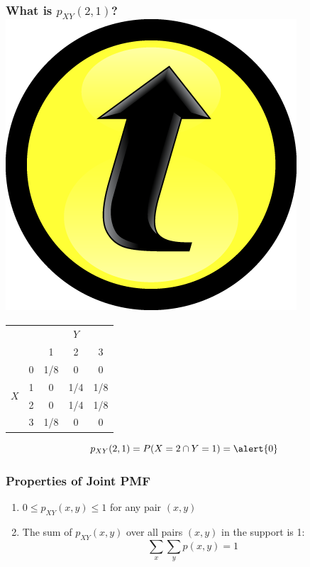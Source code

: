 \documentclass[handout]{beamer}
\begin{document}
\begin{frame}
\frametitle{What is $p_{XY}(2,1)$? \hfill \includegraphics[scale = 0.05]{./images/clicker}}

\begin{table}
\begin{tabular}{|cc|ccc|}
\hline
&&\multicolumn{3}{c|}{$Y$}\\
&&1 & 2&3\\
\hline
\multirow{4}{*}{$X$}
&0& \multicolumn{1}{|c}{\alert{1/8}} & \alert{0}& \alert{0}\\
&1& \multicolumn{1}{|c}{\alert{0}} & \alert{1/4}&\alert{1/8}\\
&2& \multicolumn{1}{|c}{\alert{0}} & \alert{1/4}&\alert{1/8}\\
&3& \multicolumn{1}{|c}{\alert{1/8}} & \alert{0}&\alert{0}\\
\hline
\end{tabular}
\end{table}

\pause

$$p_{XY}(2,1) =  P(X=2 \cap Y =1) = \alert{0}$$

\end{frame}


\begin{frame}
\frametitle{Properties of Joint PMF}
	\begin{enumerate}
		\item $0\leq p_{XY}(x,y)\leq 1$ for any pair $(x,y)$
		\item The sum of $p_{XY}(x,y)$ over all pairs $(x,y)$ in the support is 1:
			$$\sum_{x}\sum_{y} p(x,y) = 1$$
	\end{enumerate}
\end{frame}
\end{document}

